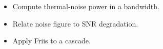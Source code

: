 \begin{objectives}
\begin{itemize}[leftmargin=1.4em,itemsep=2pt]
\item Compute thermal-noise power in a bandwidth.
\item Relate noise figure to SNR degradation.
\item Apply Friis to a cascade.
\end{itemize}
\end{objectives}
